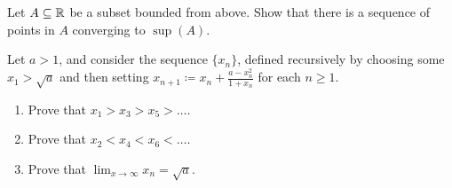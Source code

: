\documentclass[../notes.tex]{subfiles}
\begin{document}
\begin{homework}
    Let $A\subseteq \mathbb R$ be a subset bounded from above. Show that there is a sequence of points in $A$ converging to $\sup(A)$. 
\end{homework}

\begin{homework}
    Let $a > 1$, and consider the sequence $\{x_n\}$, defined recursively by choosing some $x_1>\sqrt a$ and then setting $x_{n+1} \coloneqq x_n + \frac{a-x_n^2}{1+x_n}$ for each $n\ge1$.
    \begin{enumerate}[label=(\alph*)]
        \item Prove that $x_1 > x_3 > x_5 > \ldots$.
        \item Prove that $x_2 < x_4 < x_6 < \ldots$.
        \item Prove that $\lim_{x \to \infty} x_n = \sqrt{a}$.
    \end{enumerate}
\end{homework}
\end{document}
